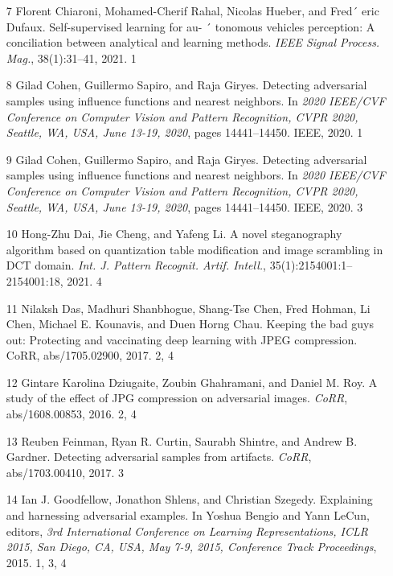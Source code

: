 \documentclass{article}
\begin{document}
\begin{itemize}
\item 
[7] Florent Chiaroni, Mohamed-Cherif Rahal, Nicolas Hueber, and Fred´ eric Dufaux. Self-supervised learning for au- ´ tonomous vehicles perception: A conciliation between analytical and learning methods. \textit{IEEE Signal Process. Mag.}, 38(1):31–41, 2021. 1

\item 
[8] Gilad Cohen, Guillermo Sapiro, and Raja Giryes. Detecting adversarial samples using influence functions and nearest neighbors. In \textit{2020 IEEE/CVF Conference on Computer Vision and Pattern Recognition, CVPR 2020, Seattle, WA, USA, June 13-19, 2020}, pages 14441–14450. IEEE, 2020. 1

\item 
[9] Gilad Cohen, Guillermo Sapiro, and Raja Giryes. Detecting adversarial samples using influence functions and nearest neighbors. In \textit{2020 IEEE/CVF Conference on Computer Vision and Pattern Recognition, CVPR 2020, Seattle, WA, USA, June 13-19, 2020}, pages 14441–14450. IEEE, 2020. 3

\item 
[10] Hong-Zhu Dai, Jie Cheng, and Yafeng Li. A novel steganography algorithm based on quantization table modification and image scrambling in DCT domain. \textit{Int. J. Pattern Recognit. Artif. Intell.}, 35(1):2154001:1–2154001:18, 2021. 4

\item 
[11] Nilaksh Das, Madhuri Shanbhogue, Shang-Tse Chen, Fred Hohman, Li Chen, Michael E. Kounavis, and Duen Horng Chau. Keeping the bad guys out: Protecting and vaccinating deep learning with JPEG compression. CoRR, abs/1705.02900, 2017. 2, 4

\item 
[12] Gintare Karolina Dziugaite, Zoubin Ghahramani, and Daniel M. Roy. A study of the effect of JPG compression on adversarial images. \textit{CoRR}, abs/1608.00853, 2016. 2, 4

\item 
[13] Reuben Feinman, Ryan R. Curtin, Saurabh Shintre, and Andrew B. Gardner. Detecting adversarial samples from artifacts. \textit{CoRR}, abs/1703.00410, 2017. 3

\item 
[14] Ian J. Goodfellow, Jonathon Shlens, and Christian Szegedy. Explaining and harnessing adversarial examples. In Yoshua Bengio and Yann LeCun, editors, \textit{3rd International Conference on Learning Representations, ICLR 2015, San Diego, CA, USA, May 7-9, 2015, Conference Track Proceedings}, 2015. 1, 3, 4


\end{itemize}
\end{document}
